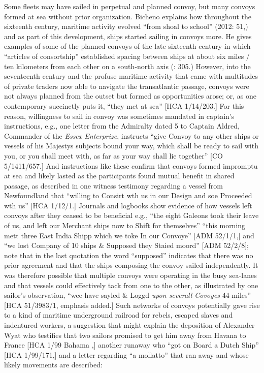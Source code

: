 Some fleets may have sailed in perpetual and planned convoy, but many convoys formed at sea without prior organization. Bicheno explains how throughout the sixteenth century, maritime activity evolved “from shoal to school” (2012: 51,) and as part of this development, ships started sailing in convoys more. He gives examples of some of the planned convoys of the late sixteenth century in which “articles of consortship” established spacing between ships at about six miles / ten kilometers from each other on a south-north axis (\citealt{Bicheno2012}: 305.) However, into the seventeenth century and the profuse maritime activity that came with multitudes of private traders now able to navigate the transatlantic passage, convoys were not always planned from the outset but formed as opportunities arose; or, as one contemporary succinctly puts it, “they met at sea” [HCA 1/14/203.] For this reason, willingness to sail in convoy was sometimes mandated in captain’s instructions, e.g., one letter from the Admiralty dated 5 \citealt{December1699} to Captain Aldred, Commander of the \textit{Essex Enterprize}, instructs “give Convoy to any other ships or vessels of his Majestys subjects bound your way, which shall be ready to sail with you, or you shall meet with, as far as your way shall lie together” [CO 5/1411/657.] And instructions like these confirm that convoys formed impromptu at sea and likely lasted as the participants found mutual benefit in shared passage, as described in one witness testimony regarding a vessel from Newfoundland that “willing to Consirt wth us in our Design and soe Proceeded wth us” [HCA 1/12/1.] Journals and logbooks show evidence of how vessels left convoys after they ceased to be beneficial e.g., “the eight Galeons took their leave of us, and left our Merchant ships now to Shift for themselves” \citep[15,]{Gage1648} “this morning mett three East India Shipp which we toke In our Convoye” [ADM 52/1/1,] and “we lost Company of 10 ships \& Supposed they Staied moord” [ADM 52/2/8]; note that in the last quotation the word “supposed” indicates that there was no prior agreement and that the ships composing the convoy sailed independently. It was therefore possible that multiple convoys were operating in the busy sea-lanes and that vessels could effectively tack from one to the other, as illustrated by one sailor’s observation, “wee have sayled \& Loggd \textit{upon severall Covoyes} 44 miles” [HCA 51/3983/1, emphasis added.]  Such networks of convoys potentially gave rise to a kind of maritime underground railroad for rebels, escaped slaves and indentured workers, a suggestion that might explain the deposition of Alexander Wyat who testifies that two sailors promised to get him away from Havana to France [HCA 1/99 Bahama \citealt{Islands1722},] another runaway who “got on Board a Dutch Ship” [HCA 1/99/171,] and a letter regarding “a mollatto” that ran away and whose likely movements are described:

